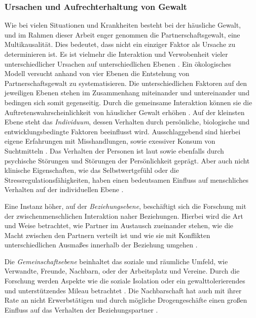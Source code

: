 
\subsubsection{Ursachen und Aufrechterhaltung von Gewalt}     \label{2.1.2.2}
Wie bei vielen Situationen und Krankheiten besteht bei der häusliche Gewalt, und im Rahmen dieser Arbeit enger genommen die Partnerschaftsgewalt, eine Multikausalität. Dies bedeutet, dass nicht ein einziger Faktor als Ursache zu determinieren ist. Es ist vielmehr die Interaktion und Verwobenheit vieler unterschiedlicher Ursachen auf unterschiedlichen Ebenen \parencite{Ursache_hG}. Ein ökologisches Modell versucht anhand von vier Ebenen die Entstehung von Partnerschaftsgewalt zu systematisieren. Die unterschiedlichen Faktoren auf den jeweiligen Ebenen stehen im Zusammenhang miteinander und untereinander und bedingen sich somit gegenseitig. Durch die gemeinsame Interaktion können sie die Auftretenswahrscheinlichkeit von häuslicher Gewalt erhöhen \parencite{Ursache_hG_2, Ursache_hG, Gewaltart}.
Auf der kleinsten Ebene steht das \textit{Individuum}, dessen Verhalten durch persönliche, biologische und entwicklungsbedingte Faktoren beeinflusst wird. Ausschlaggebend sind hierbei eigene Erfahrungen mit Misshandlungen, sowie exessiver Konsum von Suchtmitteln \parencite{Ursache_hG_2, Ursache_hG, Gewaltart}. Das Verhalten der Personen ist laut \textcite{Gewaltart} sowie \textcite{Ursache_hG_2} ebenfalls durch psychische Störungen und Störungen der Persönlichkeit geprägt. Aber auch nicht klinische Eigenschaften, wie das Selbstwertgefühl oder die Stressregulationsfähigkeiten, haben einen bedeutsamen Einfluss auf menschliches Verhalten auf der individuellen Ebene \parencite{Ursache_hG}.

Eine Instanz höher, auf der \textit{Beziehungsebene}, beschäftigt sich die Forschung mit der zwischenmenschlichen Interaktion naher Beziehungen. Hierbei wird die Art und Weise betrachtet, wie Partner im Austausch zueinander stehen, wie die Macht zwischen den Partnern verteilt ist und wie sie mit Konflikten unterschiedlichen Ausmaßes innerhalb der Beziehung umgehen \parencite{Ursache_hG_2, Ursache_hG, Gewaltart}.

Die \textit{Gemeinschaftsebene} beinhaltet das soziale und räumliche Umfeld, wie Verwandte, Freunde, Nachbarn, oder der Arbeitsplatz und Vereine. Durch die Forschung werden Aspekte wie die soziale Isolation oder ein gewalttolerierendes und unterstützendes Mileau betrachtet \parencite{Ursache_hG_2, Ursache_hG, Gewaltart}. Die Nachbarschaft hat auch mit ihrer Rate an nicht Erwerbstätigen und durch mögliche Drogengeschäfte einen großen Einfluss auf das Verhalten der Beziehungspartner \parencite{Ursache_hG, Gewaltart}.

